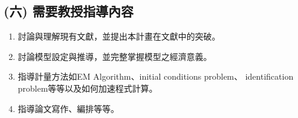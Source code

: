 \documentclass[12pt]{article}
\begin{document}
\begin{CJK*}{UTF8}{bkai}
\section*{\normalfont(六) 需要教授指導內容}
\begin{enumerate}
    \item 討論與理解現有文獻，並提出本計畫在文獻中的突破。
    \item 討論模型設定與推導，並完整掌握模型之經濟意義。
    \item 指導計量方法如EM Algorithm、initial conditions problem、
    identification problem等等以及如何加速程式計算。
    \item 指導論文寫作、編排等等。
\end{enumerate}



\end{CJK*}
\end{document}
